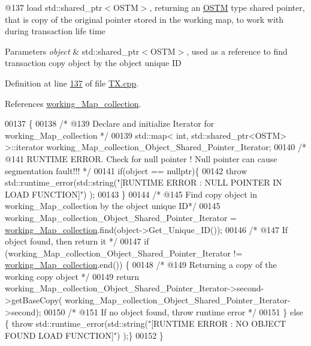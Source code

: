 @137 load std\+::shared\+\_\+ptr$<$\+O\+S\+T\+M$>$, returning an \hyperlink{class_o_s_t_m}{O\+S\+TM} type shared pointer, that is copy of the original pointer stored in the working map, to work with during transaction life time 


\begin{DoxyParams}{Parameters}
{\em object} & std\+::shared\+\_\+ptr$<$\+O\+S\+T\+M$>$, used as a reference to find transaction copy object by the object unique ID \\
\hline
\end{DoxyParams}


Definition at line \hyperlink{_t_x_8cpp_source_l00137}{137} of file \hyperlink{_t_x_8cpp_source}{T\+X.\+cpp}.



References \hyperlink{_t_x_8h_source_l00093}{working\+\_\+\+Map\+\_\+collection}.


\begin{DoxyCode}
00137                                                        \{
00138     \textcolor{comment}{/* @139 Declare and initialize Iterator for working\_Map\_collection */}
00139     std::map< int, std::shared\_ptr<OSTM> >::iterator working\_Map\_collection\_Object\_Shared\_Pointer\_Iterator;
00140     \textcolor{comment}{/* @141 RUNTIME ERROR. Check for null pointer ! Null pointer can cause segmentation fault!!! */}
00141     \textcolor{keywordflow}{if}(\textcolor{keywordtype}{object} == \textcolor{keyword}{nullptr})\{
00142         \textcolor{keywordflow}{throw} std::runtime\_error(std::string(\textcolor{stringliteral}{"[RUNTIME ERROR : NULL POINTER IN LOAD FUNCTION]"}) );
00143     \}
00144     \textcolor{comment}{/* @145 Find copy object in working\_Map\_collection by the object unique ID*/}
00145     working\_Map\_collection\_Object\_Shared\_Pointer\_Iterator = 
      \hyperlink{class_t_x_a81aafda16e2f20e36ec6c68e584668ff_a81aafda16e2f20e36ec6c68e584668ff}{working\_Map\_collection}.find(object->Get\_Unique\_ID());
00146     \textcolor{comment}{/* @147 If object found, then return it */}
00147     \textcolor{keywordflow}{if} (working\_Map\_collection\_Object\_Shared\_Pointer\_Iterator != 
      \hyperlink{class_t_x_a81aafda16e2f20e36ec6c68e584668ff_a81aafda16e2f20e36ec6c68e584668ff}{working\_Map\_collection}.end()) \{
00148         \textcolor{comment}{/* @149 Returning a copy of the working copy object */}
00149         \textcolor{keywordflow}{return} working\_Map\_collection\_Object\_Shared\_Pointer\_Iterator->second->getBaseCopy(
      working\_Map\_collection\_Object\_Shared\_Pointer\_Iterator->second);
00150     \textcolor{comment}{/* @151 If no object found, throw runtime error */}  
00151     \} \textcolor{keywordflow}{else} \{ \textcolor{keywordflow}{throw} std::runtime\_error(std::string(\textcolor{stringliteral}{"[RUNTIME ERROR : NO OBJECT FOUND LOAD FUNCTION]"}) );\}
00152 \}
\end{DoxyCode}

